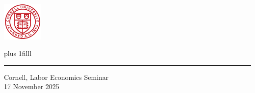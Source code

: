 \documentclass[dvipsnames,handout]{beamer} %
\begin{document}
\begin{frame}
    \vspace{1.5cm}
    \titlepage
    \begin{center}
        \vspace{-1.5cm}
        \includegraphics[width=2cm]{presentation-files/cornell}

        \vskip0pt plus 1filll
        \par\noindent\rule{\textwidth}{0.4pt}
        Cornell, Labor Economics Seminar \\
        17 November 2025
    \end{center}
\end{frame}
\end{document}
